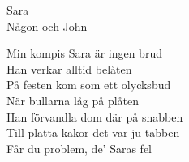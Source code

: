   {\Large Sara}\\{\tiny  Någon och John}
  \begin{vers}
Min kompis Sara är ingen brud\\
Han verkar alltid belåten\\
På festen kom som ett olycksbud\\
När bullarna låg på plåten\\
Han förvandla dom där på snabben\\
Till platta kakor det var ju tabben\\
Får du problem, de' Saras fel\\
\end{vers}